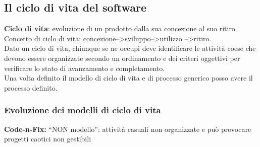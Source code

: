 \subsection{Il ciclo di vita del software}
\textbf{Ciclo di vita}: evoluzione di un prodotto dalla sua concezione al suo ritiro
Concetto di ciclo di vita: concezione-->sviluppo-->utilizzo -->ritiro.\\
Dato un ciclo di vita, chiunque se ne occupi deve identificare le attività coese che devono essere organizzate secondo un ordinamento e dei criteri oggettivi per verificare lo stato di avanzamento e completamento.\\
Una volta definito il modello di ciclo di vita e di processo generico posso avere il processo definito.

\subsubsection{Evoluzione dei modelli di ciclo di vita}
\textbf{Code-n-Fix:} ``NON modello'': attività casuali non organizzate e può provocare progetti caotici non gestibili

